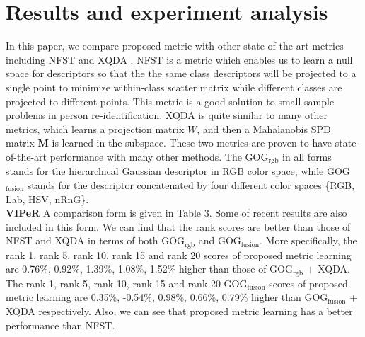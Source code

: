 \section{Results and experiment analysis}
In this paper, we compare proposed metric with other state-of-the-art metrics including NFST \cite{NFST} and XQDA \cite{LOMO}. NFST is a metric which enables us to learn a null space for descriptors so that the the same class descriptors will be projected to a single point to minimize within-class scatter matrix while different classes are projected to different points. This metric is a good solution to small sample problems in person re-identification. XQDA is quite similar to many other metrics, which learns a projection matrix $W$, and then a Mahalanobis SPD matrix $\bm{M}$ is learned in the subspace. These two metrics are proven to have state-of-the-art performance with many other methods. The GOG$_\text{rgb}$ in all forms stands for the hierarchical Gaussian descriptor in RGB color space, while GOG$_\text{fusion}$ stands for the descriptor concatenated by four different color spaces \{RGB, Lab, HSV, nRnG\}.\\
\indent\textbf{VIPeR} A comparison form is given in Table 3. Some of recent results are also included in this form. We can find that the rank scores are better than those of NFST and XQDA in terms of both GOG$_\text{rgb}$ and GOG$_\text{fusion}$. More specifically, the rank 1, rank 5, rank 10, rank 15 and rank 20 scores of proposed metric learning are 0.76\%, 0.92\%, 1.39\%, 1.08\%, 1.52\% higher than those of GOG$_\text{rgb}$ + XQDA. The rank 1, rank 5, rank 10, rank 15 and rank 20 GOG$_\text{fusion}$ scores of proposed metric learning are 0.35\%, -0.54\%, 0.98\%, 0.66\%, 0.79\% higher than GOG$_\text{fusion}$ + XQDA respectively. Also, we can see that proposed metric learning has a better performance than NFST. \newline 
